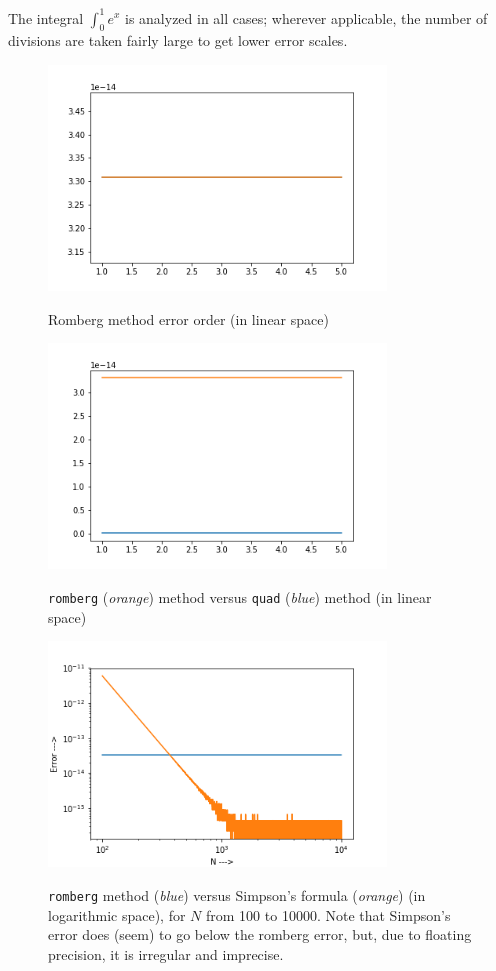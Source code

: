 \documentclass{report}
\begin{document}
 The integral $\int_{0}^{1} e^x$ is analyzed in all cases; wherever applicable, the number of divisions are taken fairly large to get lower error scales.
\begin{figure}[H]
	\centering
	\includegraphics[width = 0.8\textwidth]{scipy1.png}
	\label{scipy1}
	\caption{Romberg method error order (in linear space)}
\end{figure}
\begin{figure}[H]
	\centering
	\includegraphics[width = 0.8\textwidth]{scipy2.png}
	\label{scipy2}
	\caption{\texttt{romberg} (\emph{orange}) method versus \texttt{quad} (\emph{blue}) method (in linear space)}
\end{figure}
\begin{figure}[H]
	\centering
	\includegraphics[width = 0.8\textwidth]{scipy3.png}
	\label{scipy3}
	\caption{\texttt{romberg} method (\emph{blue}) versus Simpson's formula (\emph{orange}) (in logarithmic space), for $N$ from 100 to 10000. Note that Simpson's error does (seem) to go below the romberg error, but, due to floating precision, it is irregular and imprecise.}
\end{figure}
\end{document}
